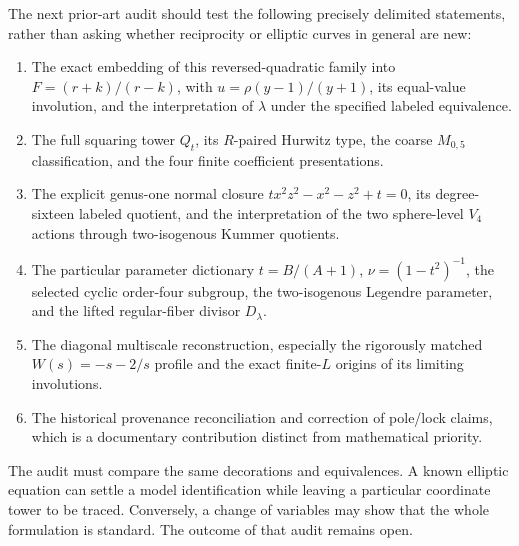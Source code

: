 The next prior-art audit should test the following precisely delimited statements, rather than asking whether reciprocity or elliptic curves in general are new:
\begin{enumerate}
\item The exact embedding of this reversed-quadratic family into \(F=(r+k)/(r-k)\), with \(u=\rho(y-1)/(y+1)\), its equal-value involution, and the interpretation of \(\lambda\) under the specified labeled equivalence.
\item The full squaring tower \(Q_t\), its \(R\)-paired Hurwitz type, the coarse \(M_{0,5}\) classification, and the four finite coefficient presentations.
\item The explicit genus-one normal closure \(tx^2z^2-x^2-z^2+t=0\), its degree-sixteen labeled quotient, and the interpretation of the two sphere-level \(V_4\) actions through two-isogenous Kummer quotients.
\item The particular parameter dictionary \(t=B/(A+1)\), \(\nu=(1-t^2)^{-1}\), the selected cyclic order-four subgroup, the two-isogenous Legendre parameter, and the lifted regular-fiber divisor \(D_\lambda\).
\item The diagonal multiscale reconstruction, especially the rigorously matched \(W(s)=-s-2/s\) profile and the exact finite-\(L\) origins of its limiting involutions.
\item The historical provenance reconciliation and correction of pole/lock claims, which is a documentary contribution distinct from mathematical priority.
\end{enumerate}
The audit must compare the same decorations and equivalences. A known elliptic equation can settle a model identification while leaving a particular coordinate tower to be traced. Conversely, a change of variables may show that the whole formulation is standard. The outcome of that audit remains open.

